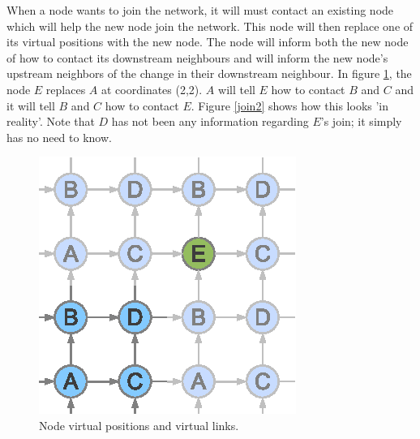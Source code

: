 \documentclass[ %
                    author={Luke Murray},
                supervisor={Dr. Simon Hollis},
                     title={Shadow Peer-to-Peer Networks},
                  subtitle={},
                    degree={MEng},
                      year={2013} ]{thesis}
\begin{document}
When a node wants to join the network, it will must contact an existing node which will help the new node join the network. This node will then replace one of its virtual positions with the new node. The node will inform both the new node of how to contact its downstream neighbours and will inform the new node's upstream neighbors of the change in their downstream neighbour. In figure \ref{join1}, the node $E$ replaces $A$ at coordinates (2,2). $A$ will tell $E$ how to contact $B$ and $C$ and it will tell $B$ and $C$ how to contact $E$. Figure \ref{join2} shows how this looks 'in reality'. Note that $D$ has not been any information regarding $E$'s join; it simply has no need to know.

\begin{figure}[h]%
    \centering
    \begin{minipage}[b]{0.35\linewidth}
        \centering
        \includegraphics[width=\linewidth]{diagrams/network_join1.eps}
        \caption{Node virtual positions and virtual links.}
        \label{join1}
    \end{minipage}
    \hspace{0.5cm}
    \begin{minipage}[b]{0.35\linewidth}
        \centering

\end{minipage}
\end{figure}
\end{document}
